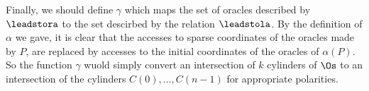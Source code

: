 %
%
%

Finally, we should define $\gamma$ which maps the set of oracles described by
$\leadstora$ to the set descirbed by the relation $\leadstola$. By the definition
of $\alpha$ we gave, it is clear that the accesses to sparse coordinates of the
oracles made by $P$, are replaced by accesses to the initial coordinates of
the oracles of $\alpha(P)$. So the function $\gamma$ wuold simply convert an
intersection of $k$ cylinders of $\Os$ to an intersection of the cylinders
$C(0), \ldots, C(n-1)$ for appropriate polarities.


